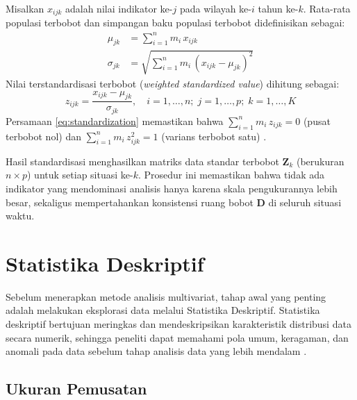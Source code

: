 \begin{definition} \label{def:weighted_zscore}
  Misalkan $x_{ijk}$ adalah nilai indikator ke-$j$ pada wilayah ke-$i$ tahun ke-$k$. Rata-rata populasi terbobot dan simpangan baku populasi terbobot didefinisikan sebagai:
  \begin{align}
    \mu_{jk} &= \sum_{i=1}^{n} m_i\, x_{ijk} \label{eq:weighted_mean} \\
    \sigma_{jk} &= \sqrt{\sum_{i=1}^{n} m_i\, (x_{ijk} - \mu_{jk})^2} \label{eq:weighted_std}
  \end{align}
  Nilai terstandardisasi terbobot (\textit{weighted standardized value}) dihitung sebagai:
  \begin{equation} \label{eq:standardization}
    z_{ijk} = \frac{x_{ijk} - \mu_{jk}}{\sigma_{jk}}, \quad i = 1, \ldots, n;\; j = 1, \ldots, p;\; k = 1, \ldots, K
  \end{equation}
  Persamaan \ref{eq:standardization} memastikan bahwa $\sum_{i=1}^{n} m_i\, z_{ijk} = 0$ (pusat terbobot nol) dan $\sum_{i=1}^{n} m_i\, z_{ijk}^2 = 1$ (varians terbobot satu) \citep{lavit94}.
\end{definition}

Hasil standardisasi menghasilkan matriks data standar terbobot $\mathbf{Z}_k$ (berukuran $n \times p$) untuk setiap situasi ke-$k$. Prosedur ini memastikan bahwa tidak ada indikator yang mendominasi analisis hanya karena skala pengukurannya lebih besar, sekaligus mempertahankan konsistensi ruang bobot $\mathbf{D}$ di seluruh situasi waktu.

\section{\normalsize Statistika Deskriptif}

Sebelum menerapkan metode analisis multivariat, tahap awal yang penting adalah melakukan eksplorasi data melalui Statistika Deskriptif. Statistika deskriptif bertujuan meringkas dan mendeskripsikan karakteristik distribusi data secara numerik, sehingga peneliti dapat memahami pola umum, keragaman, dan anomali pada data sebelum tahap analisis data yang lebih mendalam \citep{johnson2007}.

\subsection{\normalsize Ukuran Pemusatan}

